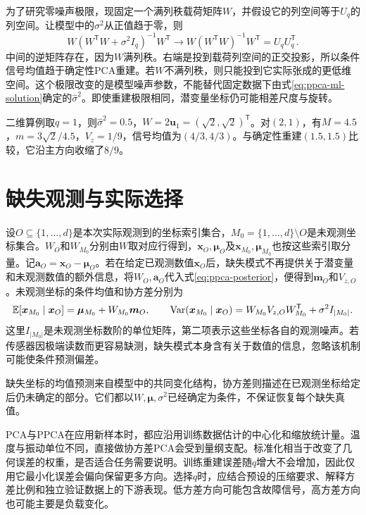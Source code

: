 为了研究零噪声极限，现固定一个满列秩载荷矩阵$W$，并假设它的列空间等于$U_q$的列空间。让模型中的$\sigma^2$从正值趋于零，则
\begin{equation}
 W(W^{\mathsf T}W+\sigma^2I_q)^{-1}W^{\mathsf T}
 \longrightarrow W(W^{\mathsf T}W)^{-1}W^{\mathsf T}=U_qU_q^{\mathsf T}.
\end{equation}
中间的逆矩阵存在，因为$W$满列秩。右端是投到载荷列空间的正交投影，所以条件信号均值趋于确定性PCA重建。若$W$不满列秩，则只能投到它实际张成的更低维空间。这个极限改变的是模型噪声参数，不能替代固定数据下由式\eqref{eq:ppca-ml-solution}确定的$\hat\sigma^2$。即使重建极限相同，潜变量坐标仍可能相差尺度与旋转。

二维算例取$q=1$，则$\hat\sigma^2=0.5$，$W=2\bm u_1=(\sqrt2,\sqrt2)^{\mathsf T}$。对$(2,1)$，有$M=4.5$，$m=3\sqrt2/4.5$，$V_z=1/9$，信号均值为$(4/3,4/3)$。与确定性重建$(1.5,1.5)$比较，它沿主方向收缩了$8/9$。

\section{缺失观测与实际选择}
设$O\subseteq\{1,\ldots,d\}$是本次实际观测到的坐标索引集合，$M_0=\{1,\ldots,d\}\setminus O$是未观测坐标集合。$W_O$和$W_{M_0}$分别由$W$取对应行得到，$\bm x_O,\bm\mu_O$及$\bm x_{M_0},\bm\mu_{M_0}$也按这些索引取分量。记$\bm a_O=\bm x_O-\bm\mu_O$。若在给定已观测数值$\bm x_O$后，缺失模式不再提供关于潜变量和未观测数值的额外信息，将$W_O,\bm a_O$代入式\eqref{eq:ppca-posterior}，便得到$\bm m_O$和$V_{z,O}$。未观测坐标的条件均值和协方差分别为
\begin{equation}
 \mathbb{E}[\bm x_{M_0}\mid\bm x_O]=\bm\mu_{M_0}+W_{M_0}\bm m_O,\qquad
 \operatorname{Var}(\bm x_{M_0}\mid\bm x_O)=W_{M_0}V_{z,O}W_{M_0}^{\mathsf T}+\sigma^2I_{|M_0|}.
\end{equation}
这里$I_{|M_0|}$是未观测坐标数阶的单位矩阵，第二项表示这些坐标各自的观测噪声。若传感器因极端读数而更容易缺测，缺失模式本身含有关于数值的信息，忽略该机制可能使条件预测偏差。

缺失坐标的均值预测来自模型中的共同变化结构，协方差则描述在已观测坐标给定后仍未确定的部分。它们都以$W,\bm\mu,\sigma^2$已经确定为条件，不保证恢复每个缺失真值。

PCA与PPCA在应用新样本时，都应沿用训练数据估计的中心化和缩放统计量。温度与振动单位不同，直接做协方差PCA会受到量纲支配。标准化相当于改变了几何误差的权重，是否适合任务需要说明。训练重建误差随$q$增大不会增加，因此仅用它最小化误差会偏向保留更多方向。选择$q$时，应结合预设的压缩要求、解释方差比例和独立验证数据上的下游表现。低方差方向可能包含故障信号，高方差方向也可能主要是负载变化。

